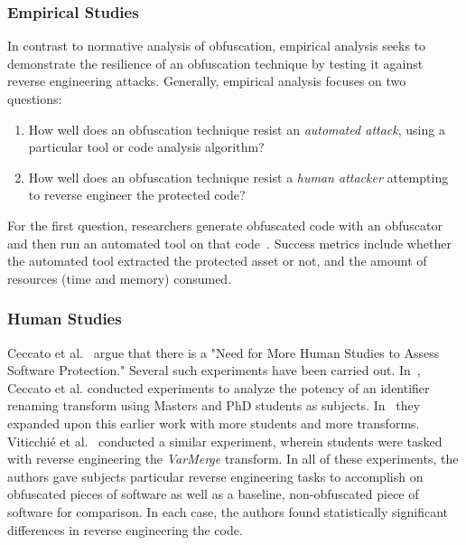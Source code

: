 \subsubsection{Empirical Studies}
In contrast to normative analysis of obfuscation, empirical analysis seeks to demonstrate the resilience of an obfuscation technique by testing it against reverse engineering attacks. Generally, empirical analysis focuses on two questions:
\begin{enumerate}
\itemsep-.5em
	\item How well does an obfuscation technique resist an {\em automated attack}, using a particular tool or code analysis algorithm? 
    \item How well does an obfuscation technique resist a {\em human attacker} attempting to reverse engineer the protected code?
\end{enumerate}

For the first question, researchers generate obfuscated code with an obfuscator and then run an automated tool on that code~\cite{banescu2016code, banescu2017characterizing, banescu2015framework}. Success metrics include whether the automated tool extracted the protected asset or not, and the amount of resources (time and memory) consumed.  

\subsubsection{Human Studies}
Ceccato et al.~\cite{ceccato2014need} argue that there is a "Need for More Human Studies to Assess Software Protection." Several such experiments have been carried out.  In~\cite{ceccato2009effectiveness}, Ceccato et al. conducted experiments to analyze the potency of an identifier renaming transform using Masters and PhD students as subjects.  In~\cite{ceccato2014family} they expanded upon this earlier work with more students and more transforms.  Viticchi{\'e} et al.~\cite{viticchie2016assessment} conducted a similar experiment, wherein students were tasked with reverse engineering the {\em VarMerge} transform.  In all of these experiments, the authors gave subjects particular reverse engineering tasks to accomplish on obfuscated pieces of software as well as a baseline, non-obfuscated piece of software for comparison. In each case, the authors found statistically significant differences in reverse engineering the code. %

